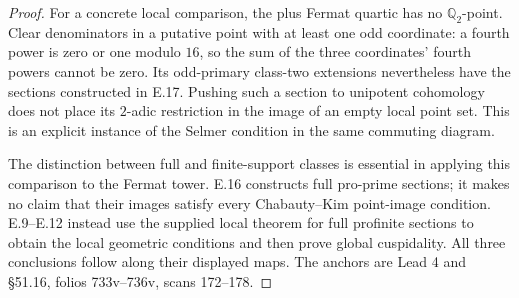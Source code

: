 \begin{proof}
For a concrete local comparison, the
plus Fermat quartic has no
$\mathbb Q_2$-point. Clear denominators
in a putative point with at least one
odd coordinate: a fourth power is
zero or one modulo $16$, so the sum
of the three coordinates' fourth
powers cannot be zero. Its odd-primary
class-two extensions nevertheless have
the sections constructed in E.17.
Pushing such a section to unipotent
cohomology does not place its
$2$-adic restriction in the image
of an empty local point set. This
is an explicit instance of the
Selmer condition in the same
commuting diagram.

The distinction between full and
finite-support classes is essential
in applying this comparison to the
Fermat tower. E.16 constructs full
pro-prime sections; it makes no
claim that their images satisfy
every Chabauty--Kim point-image
condition. E.9--E.12 instead use
the supplied local theorem for
full profinite sections to obtain
the local geometric conditions and
then prove global cuspidality.
All three conclusions follow along
their displayed maps. The anchors
are Lead 4 and \S51.16, folios
733v--736v, scans 172--178.
\end{proof}

